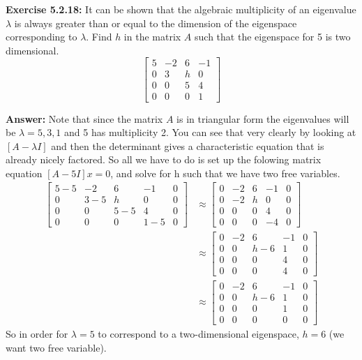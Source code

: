 \documentclass{amsart}
\begin{document}
\noindent\textbf{Exercise 5.2.18: }It can be shown that the algebraic multiplicity of an eigenvalue $\lambda$ is always greater than or equal to the dimension of the eigenspace corresponding to $\lambda$. Find $h$ in the matrix $A$ such that the eigenspace for 5 is two dimensional. 
\begin{equation*}
\begin{bmatrix}
5  &-2  &6 & -1\\
0   &3  &h  &0\\
0  & 0  &5   &4\\
0  & 0&  0  &1
\end{bmatrix}
\end{equation*}

\noindent \textbf{Answer: } Note that since the matrix $A$ is in triangular form the eigenvalues will be $\lambda = 5, 3, 1$ and 5 has multiplicity 2. You can see that very clearly by looking at $[A - \lambda I]$ and then the determinant gives a characteristic equation that is already nicely factored. So all we have to do is set up the folowing matrix equation $[A - 5I]x = 0$, and solve for h such that we have two free variables.
\begin{align*}
\begin{bmatrix}
5 -5 &-2  &6 & -1& 0\\
0   &3-5  &h  &0& 0\\
0  & 0  &5-5   &4& 0\\
0  & 0&  0  &1-5& 0
\end{bmatrix}
&\approx
\begin{bmatrix}
0 &-2  &6 & -1& 0\\
0   &-2  &h  &0& 0\\
0  & 0  &0   &4& 0\\
0  & 0&  0  &-4& 0
\end{bmatrix}\\
&\approx
\begin{bmatrix}
0 &-2  &6 & -1& 0\\
0   &0  &h-6  &1& 0\\
0  & 0  &0   &4& 0\\
0  & 0&  0  &4& 0
\end{bmatrix}\\
&\approx
\begin{bmatrix}
0 &-2  &6 & -1& 0\\
0   &0  &h-6  &1& 0\\
0  & 0  &0   &1& 0\\
0  & 0&  0  &0& 0
\end{bmatrix}
\end{align*}
So in order for $\lambda = 5$ to correspond to a two-dimensional eigenspace, $h = 6$ (we want two free variable).
\vspace{1in}
\end{document}
